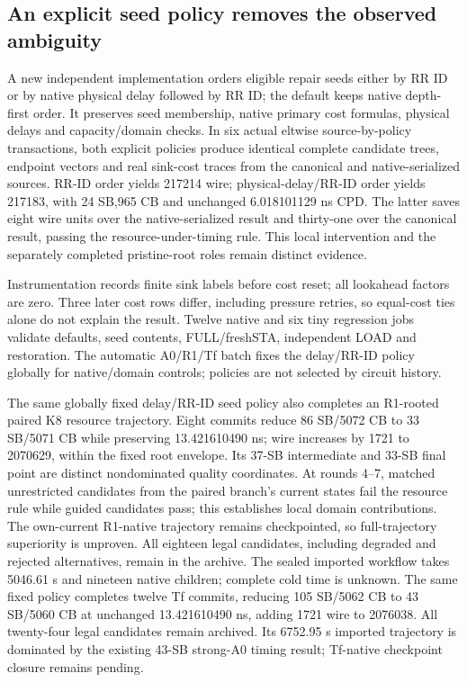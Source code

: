 \documentclass[conference,10pt]{IEEEtran}
\begin{document}
\subsection{An explicit seed policy removes the observed ambiguity}
A new independent implementation orders eligible repair seeds either by RR ID or by native physical delay followed by RR ID; the default keeps native depth-first order. It preserves seed membership, native primary cost formulas, physical delays and capacity/domain checks. In six actual eltwise source-by-policy transactions, both explicit policies produce identical complete candidate trees, endpoint vectors and real sink-cost traces from the canonical and native-serialized sources. RR-ID order yields 217214 wire; physical-delay/RR-ID order yields 217183, with 24 SB,965 CB and unchanged 6.018101129 ns CPD. The latter saves eight wire units over the native-serialized result and thirty-one over the canonical result, passing the resource-under-timing rule. This local intervention and the separately completed pristine-root roles remain distinct evidence.

Instrumentation records finite sink labels before cost reset; all lookahead factors are zero. Three later cost rows differ, including pressure retries, so equal-cost ties alone do not explain the result. Twelve native and six tiny regression jobs validate defaults, seed contents, FULL/freshSTA, independent LOAD and restoration. The automatic A0/R1/Tf batch fixes the delay/RR-ID policy globally for native/domain controls; policies are not selected by circuit history.

The same globally fixed delay/RR-ID seed policy also completes an R1-rooted paired K8 resource trajectory. Eight commits reduce 86 SB/5072 CB to 33 SB/5071 CB while preserving 13.421610490 ns; wire increases by 1721 to 2070629, within the fixed root envelope. Its 37-SB intermediate and 33-SB final point are distinct nondominated quality coordinates. At rounds 4--7, matched unrestricted candidates from the paired branch's current states fail the resource rule while guided candidates pass; this establishes local domain contributions. The own-current R1-native trajectory remains checkpointed, so full-trajectory superiority is unproven. All eighteen legal candidates, including degraded and rejected alternatives, remain in the archive. The sealed imported workflow takes 5046.61 s and nineteen native children; complete cold time is unknown. The same fixed policy completes twelve Tf commits, reducing 105 SB/5062 CB to 43 SB/5060 CB at unchanged 13.421610490 ns, adding 1721 wire to 2076038. All twenty-four legal candidates remain archived. Its 6752.95 s imported trajectory is dominated by the existing 43-SB strong-A0 timing result; Tf-native checkpoint closure remains pending.
\end{document}
